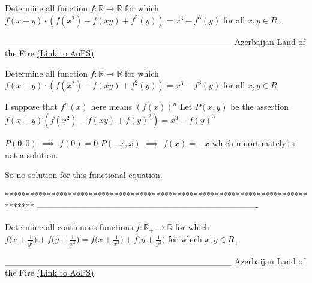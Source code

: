 \begin{problem}
	Determine all function $f: \mathbb{R}\to\mathbb{R}$ for which $f(x+y){\cdot}(f(x^2)-f(xy)+f^2(y))=x^3-f^3(y)$ for all $x,y{\in}R$ .


____________________________________
Azerbaijan Land of the Fire 
	\flushright \href{https://artofproblemsolving.com/community/c6h531681}{(Link to AoPS)}
\end{problem}



\begin{solution}
	\begin{tcolorbox}Determine all function $f: \mathbb{R}\to\mathbb{R}$ for which $f(x+y){\cdot}(f(x^2)-f(xy)+f^2(y))=x^3-f^3(y)$ for all $x,y{\in}R$ \end{tcolorbox}
I suppose that $f^n(x)$ here means $\left(f(x)\right)^n$
Let $P(x,y)$ be the assertion $f(x+y)(f(x^2)-f(xy)+f(y)^2)=x^3-f(y)^3$

$P(0,0)$ $\implies$ $f(0)=0$
$P(-x,x)$ $\implies$ $f(x)=-x$ which unfortunately is not a solution.

So no solution for this functional equation.
\end{solution}
*******************************************************************************
-------------------------------------------------------------------------------

\begin{problem}
	Determine all continuous functions $f: \mathbb{R_+}\to\mathbb{R}$ for which ${{{{f(x+\frac{1}{y^2}})+f(y+\frac{1}{x^2}})=f(x+\frac{1}{x^2}})+f(y+\frac{1}{y^2}})$  for which $x,y{\in}R_+$


____________________________________
Azerbaijan Land of the Fire 
	\flushright \href{https://artofproblemsolving.com/community/c6h531704}{(Link to AoPS)}
\end{problem}



